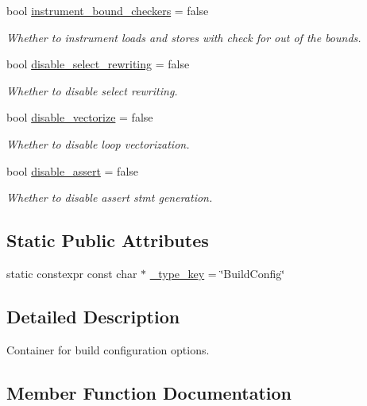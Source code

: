 \begin{DoxyCompactItemize}
bool \hyperlink{classtvm_1_1BuildConfigNode_a01df805ead94051622f60457e916e9cc}{instrument\+\_\+bound\+\_\+checkers} = false
\begin{DoxyCompactList}\small\item\em Whether to instrument loads and stores with check for out of the bounds. \end{DoxyCompactList}\item 
bool \hyperlink{classtvm_1_1BuildConfigNode_a2a8903e47165c194c23b99873e8e7e5d}{disable\+\_\+select\+\_\+rewriting} = false
\begin{DoxyCompactList}\small\item\em Whether to disable select rewriting. \end{DoxyCompactList}\item 
bool \hyperlink{classtvm_1_1BuildConfigNode_ae8af930ce70dbe693f088293bf4fadce}{disable\+\_\+vectorize} = false
\begin{DoxyCompactList}\small\item\em Whether to disable loop vectorization. \end{DoxyCompactList}\item 
bool \hyperlink{classtvm_1_1BuildConfigNode_ab44ea7dd076903dafb212210ef5f71a6}{disable\+\_\+assert} = false
\begin{DoxyCompactList}\small\item\em Whether to disable assert stmt generation. \end{DoxyCompactList}\end{DoxyCompactItemize}
\subsection*{Static Public Attributes}
\begin{DoxyCompactItemize}
\item 
static constexpr const char $\ast$ \hyperlink{classtvm_1_1BuildConfigNode_ab4090aa9a1db3a0ce85d1664e77f2a1c}{\+\_\+type\+\_\+key} = \char`\"{}Build\+Config\char`\"{}
\end{DoxyCompactItemize}


\subsection{Detailed Description}
Container for build configuration options. 

\subsection{Member Function Documentation}

